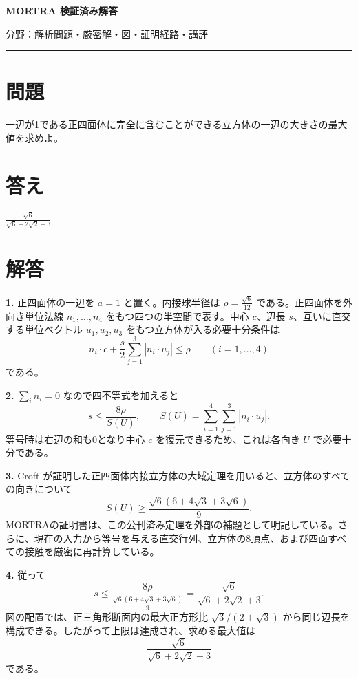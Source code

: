 \documentclass[uplatex,dvipdfmx,11pt]{jsarticle}
\begin{document}
\begin{center}
{\LARGE\bfseries MORTRA 検証済み解答\par}
\vspace{1mm}
{\small 分野：解析\qquad 問題・厳密解・図・証明経路・講評}
\end{center}
\vspace{1mm}
\hrule
\vspace{5mm}

\section*{問題}
一辺が1である正四面体に完全に含むことができる立方体の一辺の大きさの最大値を求めよ。

\section*{答え}
\(\displaystyle \frac{\sqrt{6}}{\sqrt{6} + 2 \sqrt{2} + 3}\)

\section*{解答}
\textbf{1.} 正四面体の一辺を \(a=1\) と置く。内接球半径は \(\rho=\frac{\sqrt{6}}{12}\) である。正四面体を外向き単位法線 \(n_1,\ldots,n_4\) をもつ四つの半空間で表す。中心 \(c\)、辺長 \(s\)、互いに直交する単位ベクトル \(u_1,u_2,u_3\) をもつ立方体が入る必要十分条件は \[n_i\cdot c+\frac{s}{2}\sum_{j=1}^3|n_i\cdot u_j|\le\rho\qquad(i=1,\ldots,4)\] である。

\textbf{2.} \(\sum_i n_i=0\) なので四不等式を加えると \[s\le\frac{8\rho}{S(U)},\qquad S(U)=\sum_{i=1}^4\sum_{j=1}^3|n_i\cdot u_j|.\] 等号時は右辺の和も0となり中心 \(c\) を復元できるため、これは各向き \(U\) で必要十分である。

\textbf{3.} Croft が証明した正四面体内接立方体の大域定理を用いると、立方体のすべての向きについて \[S(U)\ge \frac{\sqrt{6} \left(6 + 4 \sqrt{3} + 3 \sqrt{6}\right)}{9}.\] MORTRAの証明書は、この公刊済み定理を外部の補題として明記している。さらに、現在の入力から等号を与える直交行列、立方体の8頂点、および四面すべての接触を厳密に再計算している。

\textbf{4.} 従って \[s\le\frac{8\rho}{\frac{\sqrt{6} \left(6 + 4 \sqrt{3} + 3 \sqrt{6}\right)}{9}}=\frac{\sqrt{6}}{\sqrt{6} + 2 \sqrt{2} + 3}.\] 図の配置では、正三角形断面内の最大正方形比 \(\sqrt3/(2+\sqrt3)\) から同じ辺長を構成できる。したがって上限は達成され、求める最大値は \[\frac{\sqrt{6}}{\sqrt{6} + 2 \sqrt{2} + 3}\] である。
\end{document}
